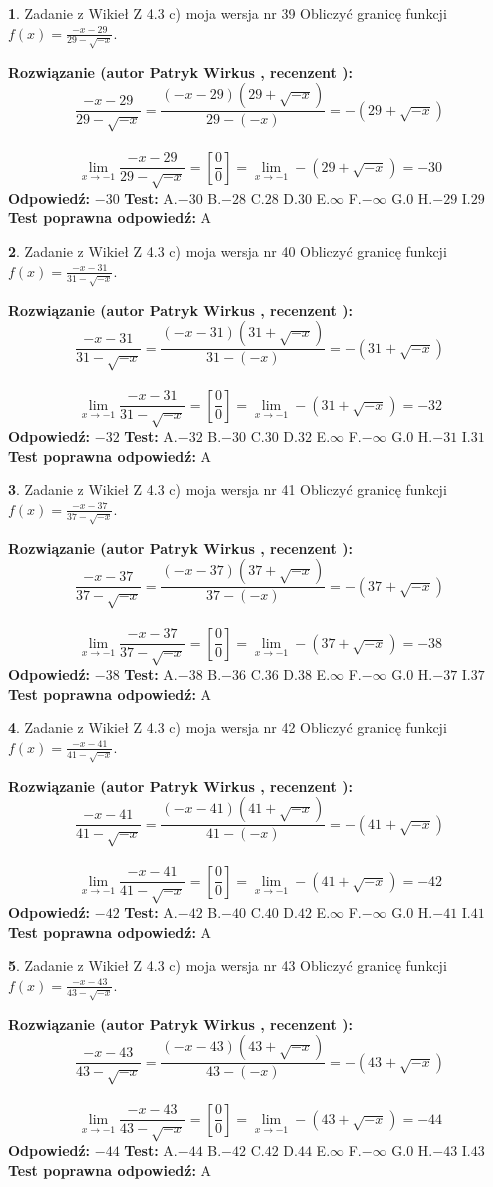 \documentclass[12pt, a4paper]{article}
\theoremstyle{definition} %
\newtheorem{zad}{}
\newcommand{\zadStart}[1]{\begin{zad}#1\newline}
\newcommand{\zadStop}{\end{zad}}
\newcommand{\rozwStart}[2]{\noindent \textbf{Rozwiązanie (autor #1 , recenzent #2): }\newline}
\newcommand{\rozwStop}{\newline}
\newcommand{\odpStart}{\noindent \textbf{Odpowiedź:}\newline}
\newcommand{\odpStop}{\newline}
\newcommand{\testStart}{\noindent \textbf{Test:}\newline}
\newcommand{\testStop}{\newline}
\newcommand{\kluczStart}{\noindent \textbf{Test poprawna odpowiedź:}\newline}
\newcommand{\kluczStop}{\newline}
\begin{document}
\zadStart{Zadanie z Wikieł Z 4.3 c) moja wersja nr 39}
Obliczyć granicę funkcji $f(x)=\frac{-x-29}{29-\sqrt{-x}}$.
\zadStop
\rozwStart{Patryk Wirkus}{}
$$\frac{-x-29}{29-\sqrt{-x}}=\frac{(-x-29)(29+\sqrt{-x})}{29-(-x)}=-(29+\sqrt{-x})$$
\\
$$\lim\limits_{x\to-1}\frac{-x-29}{29-\sqrt{-x}}=[\frac{0}{0}]=\lim\limits_{x\to-1}-(29+\sqrt{-x}) =-30$$
\rozwStop
\odpStart
$-30$
\odpStop
\testStart
A.$-30$
B.$-28$
C.$28$
D.$30$
E.$\infty$
F.$-\infty$
G.$0$
H.$-29$
I.$29$
\testStop
\kluczStart
A
\kluczStop



\zadStart{Zadanie z Wikieł Z 4.3 c) moja wersja nr 40}
Obliczyć granicę funkcji $f(x)=\frac{-x-31}{31-\sqrt{-x}}$.
\zadStop
\rozwStart{Patryk Wirkus}{}
$$\frac{-x-31}{31-\sqrt{-x}}=\frac{(-x-31)(31+\sqrt{-x})}{31-(-x)}=-(31+\sqrt{-x})$$
\\
$$\lim\limits_{x\to-1}\frac{-x-31}{31-\sqrt{-x}}=[\frac{0}{0}]=\lim\limits_{x\to-1}-(31+\sqrt{-x}) =-32$$
\rozwStop
\odpStart
$-32$
\odpStop
\testStart
A.$-32$
B.$-30$
C.$30$
D.$32$
E.$\infty$
F.$-\infty$
G.$0$
H.$-31$
I.$31$
\testStop
\kluczStart
A
\kluczStop



\zadStart{Zadanie z Wikieł Z 4.3 c) moja wersja nr 41}
Obliczyć granicę funkcji $f(x)=\frac{-x-37}{37-\sqrt{-x}}$.
\zadStop
\rozwStart{Patryk Wirkus}{}
$$\frac{-x-37}{37-\sqrt{-x}}=\frac{(-x-37)(37+\sqrt{-x})}{37-(-x)}=-(37+\sqrt{-x})$$
\\
$$\lim\limits_{x\to-1}\frac{-x-37}{37-\sqrt{-x}}=[\frac{0}{0}]=\lim\limits_{x\to-1}-(37+\sqrt{-x}) =-38$$
\rozwStop
\odpStart
$-38$
\odpStop
\testStart
A.$-38$
B.$-36$
C.$36$
D.$38$
E.$\infty$
F.$-\infty$
G.$0$
H.$-37$
I.$37$
\testStop
\kluczStart
A
\kluczStop



\zadStart{Zadanie z Wikieł Z 4.3 c) moja wersja nr 42}
Obliczyć granicę funkcji $f(x)=\frac{-x-41}{41-\sqrt{-x}}$.
\zadStop
\rozwStart{Patryk Wirkus}{}
$$\frac{-x-41}{41-\sqrt{-x}}=\frac{(-x-41)(41+\sqrt{-x})}{41-(-x)}=-(41+\sqrt{-x})$$
\\
$$\lim\limits_{x\to-1}\frac{-x-41}{41-\sqrt{-x}}=[\frac{0}{0}]=\lim\limits_{x\to-1}-(41+\sqrt{-x}) =-42$$
\rozwStop
\odpStart
$-42$
\odpStop
\testStart
A.$-42$
B.$-40$
C.$40$
D.$42$
E.$\infty$
F.$-\infty$
G.$0$
H.$-41$
I.$41$
\testStop
\kluczStart
A
\kluczStop



\zadStart{Zadanie z Wikieł Z 4.3 c) moja wersja nr 43}
Obliczyć granicę funkcji $f(x)=\frac{-x-43}{43-\sqrt{-x}}$.
\zadStop
\rozwStart{Patryk Wirkus}{}
$$\frac{-x-43}{43-\sqrt{-x}}=\frac{(-x-43)(43+\sqrt{-x})}{43-(-x)}=-(43+\sqrt{-x})$$
\\
$$\lim\limits_{x\to-1}\frac{-x-43}{43-\sqrt{-x}}=[\frac{0}{0}]=\lim\limits_{x\to-1}-(43+\sqrt{-x}) =-44$$
\rozwStop
\odpStart
$-44$
\odpStop
\testStart
A.$-44$
B.$-42$
C.$42$
D.$44$
E.$\infty$
F.$-\infty$
G.$0$
H.$-43$
I.$43$
\testStop
\kluczStart
A
\kluczStop
\end{document}
